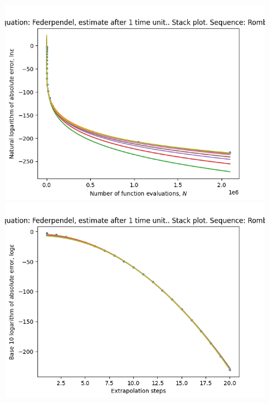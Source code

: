 \begin{figure}[H]
\centering
\begin{minipage}{0.45\textwidth}
\centering
\includegraphics[scale=0.45]{emr_plots/federpendel_1_hp_romberg_stack.png}
\end{minipage}
\begin{minipage}{0.45\textwidth}
\centering
\includegraphics[scale=0.45]{emr_plots/federpendel_1_hp_romberg_steps_stack.png}
\end{minipage}
\end{figure}

